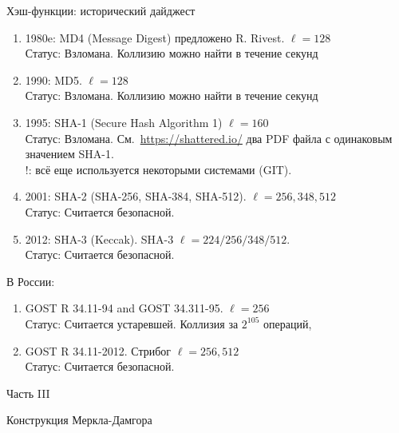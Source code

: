 \documentclass[usenames,dvipsnames,8pt,aspectratio=169]{beamer}
\begin{document}
\begin{frame}{Хэш-функции: исторический дайджест}
\large
\begin{enumerate}
\itemsep7pt
\item 1980e: MD4 (Message Digest) предложено R. Rivest.  {\color{Orange} $\ell = 128$} \\
Статус: {\color{Orange} Взломана.} Коллизию можно найти в течение секунд

\item 1990: MD5. {\color{Orange} $\ell = 128$} \\
Статус: {\color{Orange} Взломана.} Коллизию можно найти в течение секунд
\pause
\item 1995: SHA-1 (Secure Hash Algorithm 1) {\color{Orange} $\ell = 160$ } \\
Статус: {\color{Orange} Взломана}. См.\ \url{https://shattered.io/} два PDF файла с одинаковым значением SHA-1. \\
{\color{Orange} !:} всё еще используется некоторыми системами (GIT).
\pause
\item 2001: SHA-2 (SHA-256, SHA-384, SHA-512). {\color{Orange} $\ell=256, 348, 512$} \\
Статус: {\color{Orange} Считается безопасной.}
\pause
\item 2012: SHA-3 (Keccak). SHA-3 {\color{Orange} $\ell = 224/256/348/512$.} \\
Статус: {\color{Orange} Считается безопасной.} 
\end{enumerate}
\pause
В России:

\begin{enumerate}
\item GOST R 34.11-94 and GOST 34.311-95. {\color{Orange} $\ell = 256$} \\
Статус: {\color{Orange} Считается устаревшей.} Коллизия за $2^{105}$ операций,
\item  GOST R 34.11-2012. Стрибог {\color{Orange} $\ell = 256, 512$} \\
Статус: {\color{Orange} Считается безопасной.}  
\end{enumerate}
\end{frame}

\begin{frame}
Часть III \\ [10pt]
\begin{LARGE}
	
	\color{Orange}
	\Huge Конструкция Меркла-Дамгора
	
\end{LARGE}
\end{frame}
\end{document}
